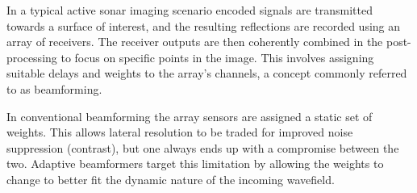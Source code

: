 \documentclass[10pt,a4paper]{article}
\newcounter{todoidx}
\newlength\marginparwidthsmall
\newcommand\todo[1]{%
      \addtocounter{todoidx}{1}%
      {\color{Red}\fbox{\bf\thetodoidx{}}}%
      \marginpar{%
         {\vspace*{-10pt}\color{Red}\fbox{\bf\thetodoidx{}}}\\%
         \fcolorbox{red}{todobackground}{\parbox{\marginparwidthsmall}{\scriptsize #1}}}}
\newcommand\todo[1]{}
\newcommand\1{\vec 1}
\begin{document}
% 
% 

In a typical active sonar imaging scenario encoded signals are transmitted towards a surface of interest, and the resulting reflections are recorded using an array of receivers. The receiver outputs are then coherently combined in the post-processing to focus on specific points in the image. This involves assigning suitable delays and weights to the array's channels, a concept commonly referred to as beamforming.

In conventional beamforming the array sensors are assigned a static set of weights. This allows lateral resolution to be traded for improved noise suppression (contrast), but one always ends up with a compromise between the two. Adaptive beamformers target this limitation by allowing the weights to change to better fit the dynamic nature of the incoming wavefield.
\end{document}
